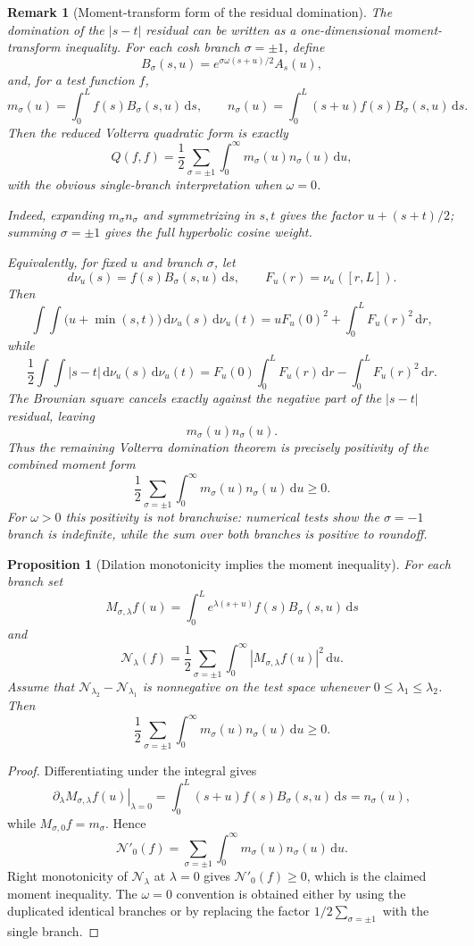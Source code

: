 \documentclass[11pt]{article}
\newtheorem{proposition}[theorem]{Proposition}
\newtheorem{remark}[theorem]{Remark}
\newcommand{\dd}{\,\mathrm d}
\begin{document}
\begin{remark}[Moment-transform form of the residual domination]
The domination of the $|s-t|$ residual can be written as a one-dimensional
moment-transform inequality.  For each cosh branch $\sigma=\pm1$, define
\[
  B_\sigma(s,u)
  =
  e^{\sigma\omega(s+u)/2}A_s(u),
\]
and, for a test function $f$,
\[
  m_\sigma(u)=\int_0^L f(s)B_\sigma(s,u)\dd s,
  \qquad
  n_\sigma(u)=\int_0^L (s+u)f(s)B_\sigma(s,u)\dd s.
\]
Then the reduced Volterra quadratic form is exactly
\[
  Q(f,f)
  =
  \frac12\sum_{\sigma=\pm1}
  \int_0^\infty m_\sigma(u)n_\sigma(u)\dd u,
\]
with the obvious single-branch interpretation when $\omega=0$.

Indeed, expanding $m_\sigma n_\sigma$ and symmetrizing in $s,t$ gives the
factor $u+(s+t)/2$; summing $\sigma=\pm1$ gives the full hyperbolic cosine
weight.

Equivalently, for fixed $u$ and branch $\sigma$, let
\[
  d\nu_u(s)=f(s)B_\sigma(s,u)\dd s,\qquad
  F_u(r)=\nu_u([r,L]).
\]
Then
\[
  \int\!\!\int \bigl(u+\min(s,t)\bigr)\dd\nu_u(s)\dd\nu_u(t)
  =
  uF_u(0)^2+\int_0^L F_u(r)^2\dd r,
\]
while
\[
  \frac12\int\!\!\int |s-t|\dd\nu_u(s)\dd\nu_u(t)
  =
  F_u(0)\int_0^L F_u(r)\dd r
  -
  \int_0^L F_u(r)^2\dd r.
\]
The Brownian square cancels exactly against the negative part of the
$|s-t|$ residual, leaving
\[
  m_\sigma(u)n_\sigma(u).
\]
Thus the remaining Volterra domination theorem is precisely positivity of the
combined moment form
\[
  \frac12\sum_{\sigma=\pm1}
  \int_0^\infty m_\sigma(u)n_\sigma(u)\dd u\ge 0.
\]
For $\omega>0$ this positivity is not branchwise: numerical tests show the
$\sigma=-1$ branch is indefinite, while the sum over both branches is positive
to roundoff.
\end{remark}

\begin{proposition}[Dilation monotonicity implies the moment inequality]
For each branch set
\[
  M_{\sigma,\lambda}f(u)
  =
  \int_0^L e^{\lambda(s+u)}f(s)B_\sigma(s,u)\dd s
\]
and
\[
  \mathcal N_\lambda(f)
  =
  \frac12\sum_{\sigma=\pm1}
  \int_0^\infty |M_{\sigma,\lambda}f(u)|^2\dd u .
\]
Assume that $\mathcal N_{\lambda_2}-\mathcal N_{\lambda_1}$ is nonnegative
on the test space whenever $0\le \lambda_1\le \lambda_2$.  Then
\[
  \frac12\sum_{\sigma=\pm1}
  \int_0^\infty m_\sigma(u)n_\sigma(u)\dd u\ge0 .
\]
\end{proposition}

\begin{proof}
Differentiating under the integral gives
\[
  \left.\partial_\lambda M_{\sigma,\lambda}f(u)\right|_{\lambda=0}
  =
  \int_0^L (s+u)f(s)B_\sigma(s,u)\dd s
  =
  n_\sigma(u),
\]
while $M_{\sigma,0}f=m_\sigma$.  Hence
\[
  \mathcal N'_0(f)
  =
  \sum_{\sigma=\pm1}
  \int_0^\infty m_\sigma(u)n_\sigma(u)\dd u .
\]
Right monotonicity of $\mathcal N_\lambda$ at $\lambda=0$ gives
$\mathcal N'_0(f)\ge0$, which is the claimed moment inequality.  The
$\omega=0$ convention is obtained either by using the duplicated identical
branches or by replacing the factor $1/2\sum_{\sigma=\pm1}$ with the single
branch.
\end{proof}
\end{document}

